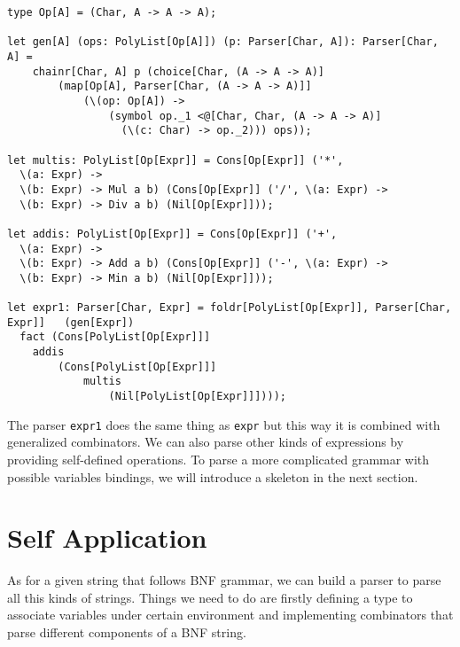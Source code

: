 \begin{lstlisting}
type Op[A] = (Char, A -> A -> A);

let gen[A] (ops: PolyList[Op[A]]) (p: Parser[Char, A]): Parser[Char, A] =
    chainr[Char, A] p (choice[Char, (A -> A -> A)]
        (map[Op[A], Parser[Char, (A -> A -> A)]]
            (\(op: Op[A]) ->
                (symbol op._1 <@[Char, Char, (A -> A -> A)]
                  (\(c: Char) -> op._2))) ops));

let multis: PolyList[Op[Expr]] = Cons[Op[Expr]] ('*',
  \(a: Expr) ->
  \(b: Expr) -> Mul a b) (Cons[Op[Expr]] ('/', \(a: Expr) ->
  \(b: Expr) -> Div a b) (Nil[Op[Expr]]));

let addis: PolyList[Op[Expr]] = Cons[Op[Expr]] ('+',
  \(a: Expr) ->
  \(b: Expr) -> Add a b) (Cons[Op[Expr]] ('-', \(a: Expr) ->
  \(b: Expr) -> Min a b) (Nil[Op[Expr]]));

let expr1: Parser[Char, Expr] = foldr[PolyList[Op[Expr]], Parser[Char, Expr]]   (gen[Expr])
  fact (Cons[PolyList[Op[Expr]]]
    addis
        (Cons[PolyList[Op[Expr]]]
            multis
                (Nil[PolyList[Op[Expr]]])));
\end{lstlisting}
The parser \texttt{expr1} does the same thing as \texttt{expr} but this way it is combined with generalized combinators. We can also parse other kinds of expressions by providing self-defined operations. To parse a more complicated grammar with possible variables bindings, we will introduce a skeleton in the next section.

\section{Self Application}
As for a given string that follows BNF grammar, we can build a parser to parse all this kinds of strings. Things we need to do are firstly defining a type to associate variables under certain environment and implementing combinators that parse different components of a BNF string.

